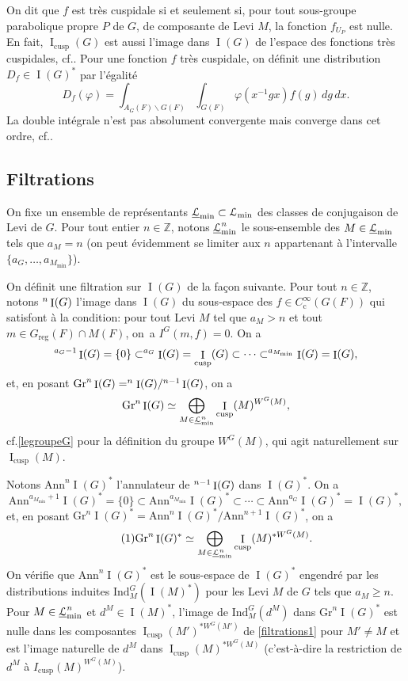 \documentclass[11pt]{article}
\newcommand{\cf}{cf.\xspace}
\numberwithin{equation}{section}\providecommand{\og}{«\,}\providecommand{\fg}{\,»}
\let\mathcal \EuScript
\newcommand{\NoChangel}[1]{%
\expandafter\let\csname old\string#1\endcsname=#1
\let#1=\relax
\newcommand{#1}{\mathcode`l="716C\csname old\string#1\endcsname\mathcode`l="7160 }%
}
\newcommand{\Ann}{\mathrm{Ann}}
\newcommand{\rc}{\mathrm{c}}
\newcommand{\cusp}{\mathrm{cusp}}
\newcommand{\Fil}{\mathrm{Fil}} \NoChangel{\Fil}
\newcommand{\Gr}{\mathrm{Gr}}
\newcommand{\Ind}{\mathrm{Ind}}
\newcommand{\reg}{\mathrm{reg}}
\DeclareMathOperator{\rI}{I}
\newcommand{\cL}{\mathcal{L}}
\newcommand{\ZZ}{\mathbb{Z}}
\theoremstyle{plain}
\theoremstyle{definition}
\begin{document}
On dit que $f$ est très cuspidale si et seulement si, pour tout sous-groupe parabolique propre $P$ de $G$, de composante de Levi $M$, la fonction $f_{U_{P}}$ est nulle. En fait, $\rI_{\cusp}(G)$ est aussi l'image dans $\rI(G)$ de l'espace des fonctions très cuspidales, \cf \cite[Lem.\,2.7]{W3}. Pour une fonction $f$ très cuspidale, on définit une distribution $D_{f}\in \rI(G)^*$ par l'égalité
\[
D_{f}(\varphi)=\int_{A_{G}(F)\backslash G(F)}\int_{G(F)}\varphi(x^{-1}gx)f(g)\,dg\,dx.
\]
La double intégrale n'est pas absolument convergente mais converge dans cet ordre, \cf \cite[Lem.\,9]{W2}.

\subsection{Filtrations}\label{filtrations}

On fixe un ensemble de représentants $\underline{\cL}_{\min}\subset \cL_{\min}$ des classes de conjugaison de Levi de $G$. Pour tout entier $n\in \ZZ$, notons $\underline{\cL}_{\min}^n$ le sous-ensemble des $M\in \underline{\cL}_{\min}$ tels que $ a_{M}=n$ (on peut évidemment se limiter aux $n$ appartenant à l'intervalle $\{a_{G},\dots,a_{M_{\min}}\}$).

On définit une filtration sur $\rI(G)$ de la façon suivante. Pour tout $n \in \ZZ$, notons $\Fil^n\rI(G)$ l'image dans $\rI(G)$ du sous-espace des $f\in C_{\rc}^{\infty}(G(F))$ qui satisfont à la condition: pour tout Levi $M$ tel que $a_{M}>n$ et tout $m\in G_{\reg}(F)\cap M(F)$, on~a $I^G(m,f)=0$. On a
\[
\Fil^{a_{G}-1}\rI(G)=\{0\}\subset \Fil^{a_{G}}\rI(G)=\rI_{\cusp}(G)\subset\cdots\subset \Fil^{a_{M_{\min}}}\rI(G)=\rI(G),
\]
et, en posant $\Gr^n\rI(G)=\Fil^n\rI(G)/\Fil^{n-1}\rI(G)$, on a
\[
\Gr^n\rI(G)\simeq \bigoplus_{M\in \underline{\cL}_{\min}^n}\rI_{\cusp}(M)^{ W^G(M)},
\]
\cf \ref{legroupeG} pour la définition du groupe $W^G(M)$, qui agit naturellement sur $\rI_{\cusp}(M)$.

Notons $\Ann^n\rI(G)^*$ l'annulateur de $\Fil^{n-1}\rI(G)$ dans $\rI(G)^*$. On a
\[
\Ann^{a_{M_{\min}}+1}\rI(G)^*=\{0\}\subset \Ann^{a_{M_{\min}}}\rI(G)^*\subset\cdots\subset \Ann^{a_{G}}\rI(G)^*=\rI(G)^*,
\]
et, en posant $\Gr^n\rI(G)^*=\Ann^n\rI(G)^*/\Ann^{n+1}\rI(G)^*$, on a
\begin{equation}\tag{1}\label{filtrations1}
\Gr^n\rI(G)^*\simeq \bigoplus_{M\in \underline{\cL}_{\min}^n}\rI_{\cusp}(M)^{* W^G(M)}.
\end{equation}
On vérifie que $\Ann^n\rI(G)^*$ est le sous-espace de $\rI(G)^*$ engendré par les distributions induites $\Ind_{M}^G(\rI(M)^*)$ pour les Levi $M$ de $G$ tels que $a_{M}\geq n$. Pour $M\in \underline{\cL}_{\min}^n$ et $d^M\in \rI(M)^*$, l'image de $\Ind_{M}^G(d^M)$ dans $\Gr^n\rI(G)^*$ est nulle dans les composantes $\rI_{\cusp}(M')^{* W^G(M')}$ de \eqref{filtrations1} pour $M'\neq M$ et est l'image naturelle de $d^M$ dans $\rI_{\cusp}(M)^{* W^G(M)}$ (c'est-à-dire la restriction de $d^{M}$ à $I_{\cusp}(M)^{ W^G(M)}$).
\end{document}
